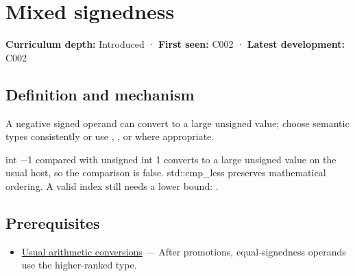 \hypertarget{appendix-736a2345de4a}{}\label{referencestart:appendix-736a2345de4a}
\section{Mixed signedness}\label{appendix-736a2345de4a-mixed-signedness}

\hypertarget{appendix-736a2345de4a-mixed-signedness}{}

\textbf{Curriculum depth:} Introduced · \textbf{First seen:} C002 · \textbf{Latest development:} C002

\begin{allmightroledefinition}

\subsection{Definition and mechanism}\label{appendix-736a2345de4a-definition-and-mechanism}

\hypertarget{appendix-736a2345de4a-definition-and-mechanism}{}

A negative signed operand can convert to a large unsigned value; choose semantic types consistently or use , , or  where appropriate.

\end{allmightroledefinition}

int −1 compared with unsigned int 1 converts to a large unsigned value on the usual host, so the comparison is false. std::cmp\_less preserves mathematical ordering. A valid index still needs a lower bound: .

\subsection{Prerequisites}\label{appendix-736a2345de4a-prerequisites}

\hypertarget{appendix-736a2345de4a-prerequisites}{}

\begin{itemize}
\tightlist
\item
  \hyperref[appendix-5e2d663adf7f]{Usual arithmetic conversions} --- After promotions, equal-signedness operands use the higher-ranked type.
\end{itemize}


